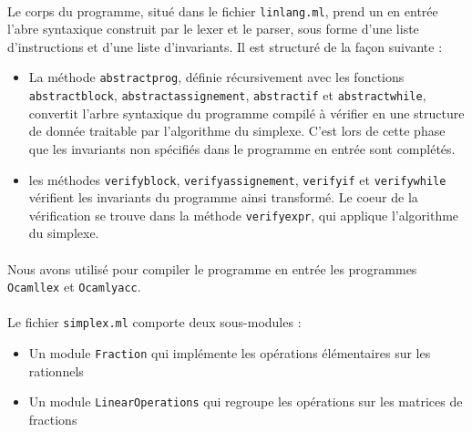 \documentclass[a4paper]{article}
\begin{document}
\paragraph{}

Le corps du programme, situé dans le fichier \texttt{linlang.ml}, prend un en entrée l'abre syntaxique construit par le lexer et le parser, sous forme d'une liste d'instructions et d'une liste d'invariants. Il est structuré de la façon suivante :

\begin{itemize}
  \item La méthode \texttt{abstract\textunderscore prog}, définie récursivement avec les fonctions \texttt{abstract\textunderscore block}, \texttt{abstract\textunderscore assignement}, \texttt{abstract\textunderscore if} et \texttt{abstract\textunderscore while}, convertit l'arbre syntaxique du programme compilé à vérifier en une structure de donnée traitable par l'algorithme du simplexe. C'est lors de cette phase que les invariants non spécifiés dans le programme en entrée sont complétés.
  \item les méthodes \texttt{verify\textunderscore block}, \texttt{verify\textunderscore assignement}, \texttt{verify\textunderscore if} et \texttt{verify\textunderscore while} vérifient les invariants du programme ainsi transformé. Le coeur de la vérification se trouve dans la méthode \texttt{verify\textunderscore expr}, qui applique l'algorithme du simplexe.
\end{itemize}

\paragraph{}

Nous avons utilisé pour compiler le programme en entrée les programmes \texttt{Ocamllex} et \texttt{Ocamlyacc}.

\paragraph{}

Le fichier \texttt{simplex.ml} comporte deux sous-modules :

\begin{itemize}
  \item Un module \texttt{Fraction} qui implémente les opérations élémentaires sur les rationnels
  \item Un module \texttt{LinearOperations} qui regroupe les opérations sur les matrices de fractions
\end{itemize}
\end{document}
